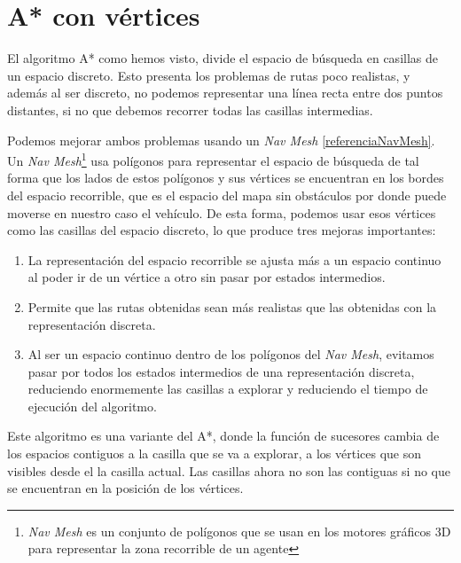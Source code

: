 \section{A* con vértices} \label{avertices}
El algoritmo A* como hemos visto, divide el espacio de búsqueda en casillas de un espacio discreto. Esto presenta los problemas de rutas poco realistas, y además al ser discreto, no podemos representar una línea recta entre dos puntos distantes, si no que debemos recorrer todas las casillas intermedias.

Podemos mejorar ambos problemas usando un \textit{Nav Mesh} \ref{referenciaNavMesh}.  Un \textit{Nav Mesh}\footnote{\textit{Nav Mesh} es un conjunto de polígonos que se usan en los motores gráficos 3D para representar la zona recorrible de un agente} usa polígonos para representar el espacio de búsqueda de tal forma que los lados de estos polígonos y sus vértices se encuentran en los bordes del espacio recorrible, que es el espacio del mapa sin obstáculos por donde puede moverse en nuestro caso el vehículo. De esta forma, podemos usar esos vértices como las casillas del espacio discreto, lo que produce tres mejoras importantes:

\begin{enumerate}
\item La representación del espacio recorrible se ajusta más a un espacio continuo al poder ir de un vértice a otro sin pasar por estados intermedios.
\item Permite que las rutas obtenidas sean más realistas que las obtenidas con la representación discreta.
\item Al ser un espacio continuo dentro de los polígonos del \textit{Nav Mesh}, evitamos pasar por todos los estados intermedios de una representación discreta, reduciendo enormemente las casillas a explorar y reduciendo el tiempo de ejecución del algoritmo.
\end{enumerate}

Este algoritmo es una variante del A*, donde la función de sucesores cambia de los espacios contiguos a la casilla que se va a explorar, a los vértices que son visibles desde el la casilla actual. Las casillas ahora no son las contiguas si no que se encuentran en la posición de los vértices.

